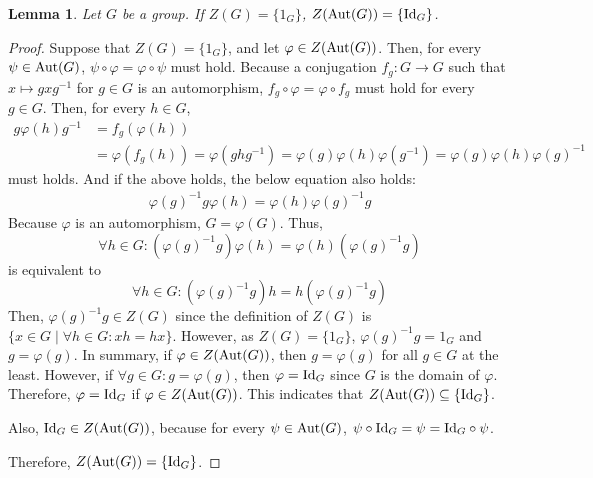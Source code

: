 \documentclass{article}
\newtheorem{lemma}{Lemma}
\newcommand{\Aut}{\textnormal{Aut}}
\newcommand{\Id}{\textnormal{Id}}
\begin{document}
\begin{lemma}\label{lem-cen-aut}
  Let \(G\) be a group. If \(Z(G) = \{1_G\}\), \(Z(\Aut(G)) = \{\Id_G\}\).
\end{lemma}
\begin{proof}
  Suppose that \(Z(G) = \{1_G\}\), and let \(\varphi \in Z(\Aut(G))\).
  Then, for every \(\psi \in \Aut(G)\), \(\psi \circ \varphi = \varphi \circ \psi\) must hold.
  Because a conjugation \(f_g: G \to G\) such that \(x \mapsto gxg^{-1}\) for \(g \in G\) is an automorphism,
  \(f_g \circ \varphi = \varphi \circ f_g\) must hold for every \(g \in G\).
  Then, for every \(h \in G\),
  \begin{align*}
    g\varphi(h)g^{-1} &= f_g(\varphi(h))
    \\&= \varphi(f_g(h)) = \varphi(ghg^{-1})
    = \varphi(g)\varphi(h)\varphi(g^{-1}) = \varphi(g)\varphi(h)\varphi(g)^{-1}
  \end{align*}
  must holds. And if the above holds, the below equation also holds:
  \begin{align*}
    \varphi(g)^{-1}g \varphi(h) = \varphi(h) \varphi(g)^{-1}g
  \end{align*}
  Because \(\varphi\) is an automorphism, \(G = \varphi(G)\).
  Thus, \[\forall h \in G: (\varphi(g)^{-1}g) \varphi(h) = \varphi(h) (\varphi(g)^{-1}g)\]
  is equivalent to \[\forall h \in G: (\varphi(g)^{-1}g) h = h (\varphi(g)^{-1}g)\]
  Then,
  \(\varphi(g)^{-1}g \in Z(G)\)
  since the definition of \(Z(G)\) is \(\{x \in G \mid \forall h \in G : xh = hx \}\).
  However, as \(Z(G) = \{1_G\}\), \(\varphi(g)^{-1}g = 1_G\) and \(g = \varphi(g)\).
  In summary, if \(\varphi \in Z(\Aut(G))\), then \(g = \varphi(g)\) for all \(g \in G\) at the least.
  However, if \(\forall g \in G: g = \varphi(g)\), then \(\varphi = \Id_G\) since \(G\) is the domain of \(\varphi\).
  Therefore, \(\varphi = \Id_G\) if \(\varphi \in Z(\Aut(G))\).
  This indicates that \(Z(\Aut(G)) \subseteq \{\Id_G\}\).

  Also, \(\Id_G \in Z(\Aut(G))\),
  because for every \(\psi \in \Aut(G)\), \(\psi \circ \Id_G = \psi = \Id_G \circ \psi\).

  Therefore, \(Z(\Aut(G)) = \{\Id_G\}\).
\end{proof}
\end{document}
